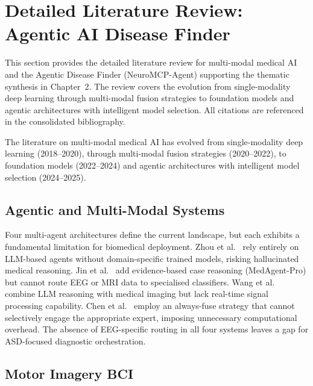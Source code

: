 
\section{Detailed Literature Review: Agentic AI Disease Finder}
\label{app:ch2_agentic}
\label{sec:topic5_agentic}

This section provides the detailed literature review for multi-modal medical AI and the Agentic Disease Finder (NeuroMCP-Agent) supporting the thematic synthesis in Chapter~2. The review covers the evolution from single-modality deep learning through multi-modal fusion strategies to foundation models and agentic architectures with intelligent model selection. All citations are referenced in the consolidated bibliography.

The literature on multi-modal medical AI has evolved from single-modality deep learning (2018--2020), through multi-modal fusion strategies (2020--2022), to foundation models (2022--2024) and agentic architectures with intelligent model selection (2024--2025).

\subsection{Agentic and Multi-Modal Systems}

Four multi-agent architectures define the current landscape, but each exhibits a fundamental limitation for biomedical deployment. Zhou et al.~\cite{zhou2025mam} rely entirely on LLM-based agents without domain-specific trained models, risking hallucinated medical reasoning. Jin et al.~\cite{jin2025medagent} add evidence-based case reasoning (MedAgent-Pro) but cannot route EEG or MRI data to specialised classifiers. Wang et al.~\cite{wang2025llmagent} combine LLM reasoning with medical imaging but lack real-time signal processing capability. Chen et al.~\cite{chen2025adacomed} employ an always-fuse strategy that cannot selectively engage the appropriate expert, imposing unnecessary computational overhead. The absence of EEG-specific routing in all four systems leaves a gap for ASD-focused diagnostic orchestration.

\subsection{Motor Imagery BCI}

